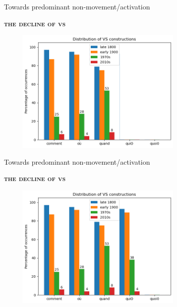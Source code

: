\documentclass[lesson_slides]{subfiles}
\begin{document}
\begin{frame}[c]{Towards predominant non-movement/activation}

    \textbf{\textsc{the decline of vs}}
    \begin{center}
        \includegraphics[width=10cm, height=6cm]{images/VS3.png}
    \end{center}
  
\end{frame}
\begin{frame}[c]{Towards predominant non-movement/activation}

    \textbf{\textsc{the decline of vs}}
    \begin{center}
        \includegraphics[width=10cm, height=6cm]{images/VS4.png}
    \end{center}
  
\end{frame}
\end{document}
